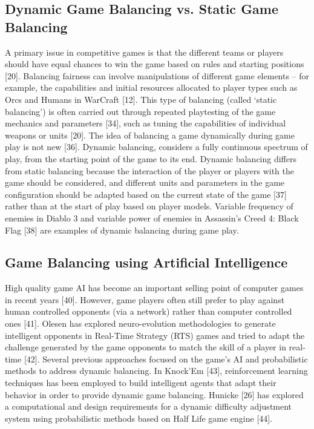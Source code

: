 \documentclass{uofsthesis-cs}
\begin{document}
\subsection{Dynamic Game Balancing vs. Static Game Balancing }
A primary issue in competitive games is that the different teams or players should have equal chances to win the game based on rules and starting positions [20]. Balancing fairness can involve manipulations of different game elements – for example, the capabilities and initial resources allocated to player types such as Orcs and Humans in WarCraft [12]. This type of balancing (called ‘static balancing’) is often carried out through repeated playtesting of the game mechanics and parameters [34], such as tuning the capabilities of individual weapons or units [20].  The idea of balancing a game dynamically during game play is not new [36]. Dynamic balancing, considers a fully continuous spectrum of play, from the starting point of the game to its end. Dynamic balancing differs from static balancing because the interaction of the player or players with the game should be considered, and different units and parameters in the game configuration should be adapted based on the current state of the game [37] rather than at the start of play based on player models. Variable frequency of enemies in Diablo 3 and variable power of enemies in Assassin’s Creed 4: Black Flag [38] are examples of dynamic balancing during game play. 


\subsection{Game Balancing using Artificial Intelligence}
High quality game AI has become an important selling point of computer games in recent years [40]. However, game players often still prefer to play against human controlled opponents (via a network) rather than computer controlled ones [41]. Olesen has explored neuro-evolution methodologies to generate intelligent opponents in Real-Time Strategy (RTS) games and tried to adapt the challenge generated by the game opponents to match the skill of a player in real-time [42]. Several previous approaches focused on the game’s AI and probabilistic methods to address dynamic balancing. In Knock’Em [43], reinforcement learning techniques has been employed to build intelligent agents that adapt their behavior in order to provide dynamic game balancing. Hunicke [26] has explored a computational and design requirements for a dynamic difficulty adjustment system using probabilistic methods based on Half Life game engine [44]. 
\end{document}
